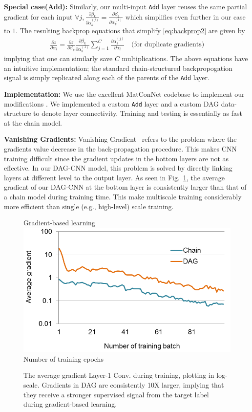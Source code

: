 \documentclass[10pt,twocolumn,letterpaper]{article}
\begin{document}
{\bf Special case(Add):} Similarly, our multi-input {\tt Add} layer reuses the same partial gradient for each input
$\forall j, \frac{\partial \beta_k}{\partial \alpha_k^{(j)}} = \frac{\partial \beta_k}{\partial \alpha_k^{(1)}}$ which simplifies even further in our case to $1$. The resulting backprop equations that simplify \eqref{eq:backprop2} are given by
\begin{align}
\frac{\partial z}{\partial \alpha_i} = \frac{\partial z}{\partial \beta_k} \frac{\partial \beta_k}{\partial \alpha_k^{(1)}}\sum_{j=1}^{C} \frac{\partial \alpha_k^{(j)}}{\partial \alpha_i}  \quad \text{(for duplicate gradients)}
\end{align}
\noindent implying that one can similarly save $C$ multiplications. The above equations have an intuitive implementation; the standard chain-structured backpropogation signal is simply replicated along each of the parents of the {\tt Add} layer.

{\bf Implementation:} We use the excellent MatConNet codebase to implement our modifications \cite{vedaldimatconvnet}. We implemented a custom {\tt Add} layer and a custom DAG data-structure to denote layer connectivity. Training and testing is essentially as fast at the chain model.

{\bf Vanishing Gradients:} Vanishing Gradient~\cite{bengio1994learning} refers to the problem where the gradients value decrease in the back-propagation procedure. This makes CNN training difficult since the gradient updates in the bottom layers are not as effective. In our DAG-CNN model, this problem is solved by directly linking layers at different level to the output layer. As seen in Fig.~\ref{fig:grad}, the average gradient of our DAG-CNN at the bottom layer is consistently larger than that of a chain model during training time. This make multiscale training considerably more efficient than single (e.g., high-level) scale training.

\begin{figure}[htbp]
\centering
Gradient-based learning\\
	\includegraphics[width=.8\columnwidth,clip=true,trim=10mm 10mm 0mm 0mm]{fig/fig_grad.png}\\
{\footnotesize Number of training epochs}
\caption{The average gradient Layer-1 Conv. during training, plotting in log-scale. Gradients in DAG are consistently 10X larger, implying that they receive a stronger supervised signal from the target label during gradient-based learning.}
\label{fig:grad}
\end{figure}
\end{document}
